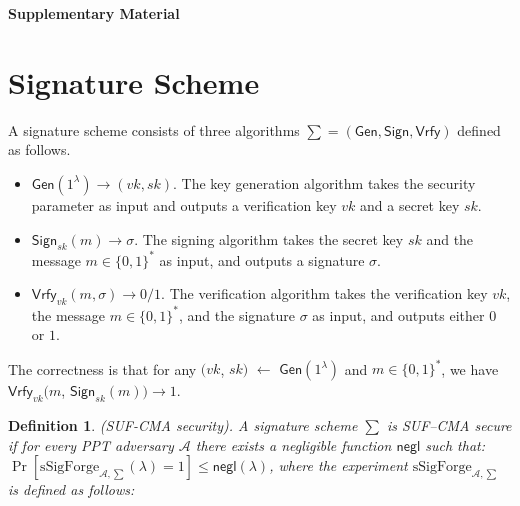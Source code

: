 \documentclass{llncs}
\newtheorem{Definition}{Definition}
\begin{document}




\newpage

\begin{center}
\huge{\textbf{Supplementary Material}}
\end{center}

\appendix
\renewcommand{\appendixname}{Appendix~\Alph{section}}

\section{Signature Scheme}

A signature scheme consists of three algorithms $\sum = (\mathsf{Gen},\mathsf{Sign},\mathsf{Vrfy})$ defined as follows. 

\begin{itemize}
\item $\mathsf{Gen}(1^\lambda)\rightarrow (vk,sk)$. The key generation algorithm takes the security parameter as input and outputs a verification key $vk$ and a secret key $sk$.
\item $\mathsf{Sign}_{sk}(m)\rightarrow \sigma$. The signing algorithm takes the secret key $sk$ and the message $m\in\{0,1\}^*$ as input, and outputs a signature $\sigma$. 
\item $\mathsf{Vrfy}_{vk}(m,\sigma)\rightarrow 0/1$. The verification algorithm takes the verification key $vk$, the message $m\in\{0,1\}^*$, and the signature $\sigma$ as input, and outputs either $0$ or $1$.
\end{itemize}

The correctness is that for any $(vk$, $sk)$ $\leftarrow$ $\mathsf{Gen}(1^\lambda)$ and $m\in\{0,1\}^*$, we have $\mathsf{Vrfy}_{vk}(m$, $\mathsf{Sign}_{sk}(m))\rightarrow 1$.

\begin{Definition}\emph{(SUF-CMA security).} A signature scheme $\sum$ is SUF–CMA secure if for every PPT adversary $\mathcal{A}$ there exists a negligible function $\mathsf{negl}$ such that: $\Pr[\text{sSigForge}_{\mathcal{A},\sum}(\lambda) = 1] \leq \mathsf{negl}(\lambda)$, where the experiment $\text{sSigForge}_{\mathcal{A},\sum}$ is defined as follows:
\end{Definition}
\end{document}
